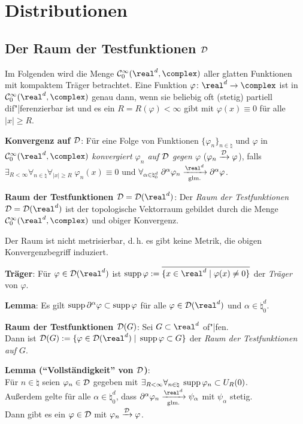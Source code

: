 \chapter{%
    Distributionen%
}

\section{%
    Der Raum der Testfunktionen \texorpdfstring{$\mathcal{D}$}{D}%
}

Im Folgenden wird die Menge $\C_0^\infty(\real^d, \complex)$
aller glatten Funktionen mit kompaktem Träger betrachtet.
Eine Funktion $\varphi\colon \real^d \rightarrow \complex$ ist in
$\C_0^\infty(\real^d, \complex)$ genau dann, wenn
sie beliebig oft (stetig) partiell dif"|ferenzierbar ist und
es ein $R = R(\varphi) < \infty$ gibt mit $\varphi(x) \equiv 0$ für alle
$|x| \ge R$.

\textbf{Konvergenz auf $\mathcal{D}$}:
Für eine Folge von Funktionen $\{\varphi_n\}_{n \in \natural}$ und
$\varphi$ in $\C_0^\infty(\real^d, \complex)$
\emph{konvergiert $\varphi_n$ auf $\mathcal{D}$ gegen $\varphi$}
($\varphi_n \xrightarrow{\mathcal{D}} \varphi$), falls
$\exists_{R < \infty} \forall_{n \in \natural} \forall_{|x| \ge R}\;
\varphi_n(x) \equiv 0$ und
$\forall_{\alpha \in \natural_0^d}\;
\partial^\alpha \varphi_n \xrightarrow[\text{glm.}]{\real^d}
\partial^\alpha \varphi$.

\textbf{Raum der Testfunktionen $\D = \D(\real^d)$}:
Der \emph{Raum der Testfunktionen}
$\D = \D(\real^d)$ ist der topologische Vektorraum gebildet durch die Menge
$\C_0^\infty(\real^d, \complex)$ und obiger Konvergenz.

Der Raum ist nicht metrisierbar, d.\,h. es gibt keine Metrik, die obigen
Konvergenzbegriff induziert.

\linie

\textbf{Träger}:
Für $\varphi \in \D(\real^d)$ ist
$\supp \varphi := \overline{\{x \in \real^d \;|\; \varphi(x) \not= 0\}}$
der \emph{Träger} von $\varphi$.

\textbf{Lemma}:
Es gilt $\operatorname{supp} \partial^\alpha \varphi \subset \operatorname{supp} \varphi$ für alle
$\varphi \in \D(\real^d)$ und $\alpha \in \natural_0^d$.

\textbf{Raum der Testfunktionen $\mathcal{D}(G)$}:
Sei $G \subset \real^d$ of"|fen.\\
Dann ist $\D(G) := \{\varphi \in \D(\real^d) \;|\; \supp \varphi \subset G\}$
der \emph{Raum der Testfunktionen auf $G$}.

\linie

\textbf{Lemma ("`Vollständigkeit"' von $\mathcal{D}$)}:\\
Für $n \in \natural$ seien $\varphi_n \in \mathcal{D}$ gegeben mit
$\exists_{R < \infty} \forall_{n \in \natural}\;
\operatorname{supp} \varphi_n \subset U_R(0)$.\\
Außerdem gelte für alle $\alpha \in \natural_0^d$, dass
$\partial^\alpha \varphi_n
\xrightarrow[\text{glm.}]{\real^d} \psi_\alpha$ mit
$\psi_\alpha$ stetig.\\
Dann gibt es ein $\varphi \in \mathcal{D}$ mit $\varphi_n \xrightarrow{\mathcal{D}} \varphi$.

